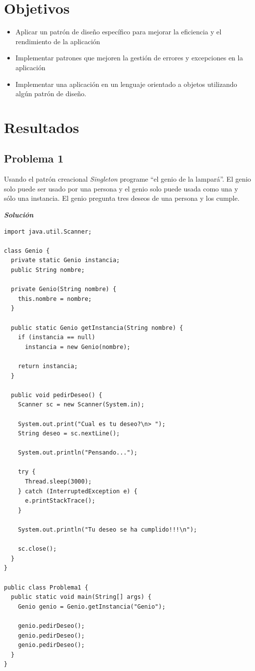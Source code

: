 \documentclass[11pt, twocolumn]{article}
\begin{document}
  \section*{Objetivos}
  \begin{itemize}
    \item Aplicar un patrón de diseño específico para mejorar la eficiencia y el rendimiento de la aplicación
    \item Implementar patrones que mejoren la gestión de errores y excepciones en la aplicación
    \item Implementar una aplicación en un lenguaje orientado a objetos utilizando algún patrón de diseño.
  \end{itemize}

  \section*{Resultados}
  \subsection*{Problema 1}
  Usando el patrón creacional \textit{Singleton} programe ``el genio de la lampará''. El genio solo puede ser usado por una persona y el genio solo puede usada como una y sólo una instancia. El genio pregunta tres deseos de una persona y los cumple.

  \textit{\textbf{Solución}}
  \begin{lstlisting}
import java.util.Scanner;

class Genio {
  private static Genio instancia;
  public String nombre;

  private Genio(String nombre) {
    this.nombre = nombre;
  }

  public static Genio getInstancia(String nombre) {
    if (instancia == null)
      instancia = new Genio(nombre);

    return instancia;
  }

  public void pedirDeseo() {
    Scanner sc = new Scanner(System.in);
    
    System.out.print("Cual es tu deseo?\n> ");
    String deseo = sc.nextLine();

    System.out.println("Pensando...");

    try {
      Thread.sleep(3000);
    } catch (InterruptedException e) {
      e.printStackTrace();
    }

    System.out.println("Tu deseo se ha cumplido!!!\n");

    sc.close();
  }
}

public class Problema1 {
  public static void main(String[] args) {
    Genio genio = Genio.getInstancia("Genio");

    genio.pedirDeseo();
    genio.pedirDeseo();
    genio.pedirDeseo();
  }
}
  \end{lstlisting}
\end{document}
